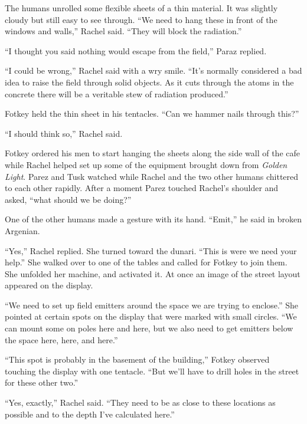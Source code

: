 



The humans unrolled some flexible sheets of a thin material. It was slightly cloudy but still
easy to see through. ``We need to hang these in front of the windows and walls,'' Rachel said.
``They will block the radiation.''

``I thought you said nothing would escape from the field,'' Paraz replied.

``I could be wrong,'' Rachel said with a wry smile. ``It's normally considered a bad idea to
raise the field through solid objects. As it cuts through the atoms in the concrete there will
be a veritable stew of radiation produced.''

Fotkey held the thin sheet in his tentacles. ``Can we hammer nails through this?''

``I should think so,'' Rachel said.

Fotkey ordered his men to start hanging the sheets along the side wall of the cafe while Rachel
helped set up some of the equipment brought down from \textit{Golden Light}. Parez and Tusk
watched while Rachel and the two other humans chittered to each other rapidly. After a moment
Parez touched Rachel's shoulder and asked, ``what should we be doing?''

One of the other humans made a gesture with its hand. ``Emit,'' he said in broken Argenian.

``Yes,'' Rachel replied. She turned toward the dunari. ``This is were we need your help.'' She
walked over to one of the tables and called for Fotkey to join them. She unfolded her machine,
and activated it. At once an image of the street layout appeared on the display.

``We need to set up field emitters around the space we are trying to enclose.'' She pointed at
certain spots on the display that were marked with small circles. ``We can mount some on poles
here and here, but we also need to get emitters below the space here, here, and here.''

``This spot is probably in the basement of the building,'' Fotkey observed touching the display
with one tentacle. ``But we'll have to drill holes in the street for these other two.''

``Yes, exactly,'' Rachel said. ``They need to be as close to these locations as possible and to
the depth I've calculated here.''

